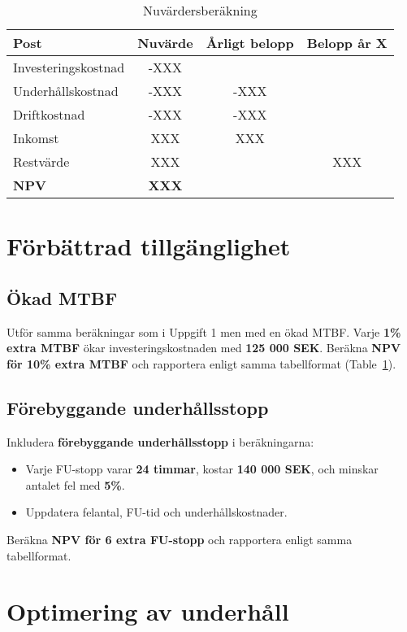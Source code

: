 \documentclass[a4paper,12pt]{exam}
\begin{document}
\begin{table}[h]
    \centering
    \begin{tabular}{lccc}
        \toprule
        \textbf{Post} & \textbf{Nuvärde} & \textbf{Årligt belopp} & \textbf{Belopp år X} \\
        \midrule
        Investeringskostnad & -XXX &  &  \\
        Underhållskostnad & -XXX & -XXX &  \\
        Driftkostnad & -XXX & -XXX &  \\
        Inkomst & XXX & XXX &  \\
        Restvärde & XXX &  &  XXX\\
        \textbf{NPV} & \textbf{XXX} &  &  \\
        \bottomrule
    \end{tabular}
    \caption{Nuvärdersberäkning}
    \label{NPVtable}
\end{table}


\section{Förbättrad tillgänglighet}
\subsection{Ökad MTBF}
Utför samma beräkningar som i Uppgift 1 men med en ökad MTBF. Varje \textbf{1\% extra MTBF} ökar investeringskostnaden med \textbf{125 000 SEK}. Beräkna \textbf{NPV för 10\% extra MTBF} och rapportera enligt samma tabellformat (Table~\ref{NPVtable}).

\subsection{Förebyggande underhållsstopp}
Inkludera \textbf{förebyggande underhållsstopp} i beräkningarna:
\begin{itemize}
    \item Varje FU-stopp varar \textbf{24 timmar}, kostar \textbf{140 000 SEK}, och minskar antalet fel med \textbf{5\%}.
    \item Uppdatera felantal, FU-tid och underhållskostnader.
\end{itemize}
Beräkna \textbf{NPV för 6 extra FU-stopp} och rapportera enligt samma tabellformat.

\section{Optimering av underhåll}
\end{document}
